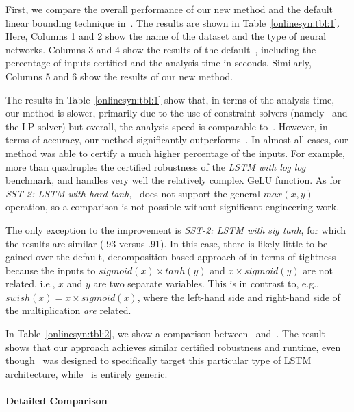 First, we compare the overall performance of our new method and the
default linear bounding technique in~\autolipra{}.  The results are shown
in Table~\ref{onlinesyn:tbl:1}.  Here, Columns 1 and 2 show the name of the dataset
and the type of neural networks.  Columns 3 and 4 show the results of the
default~\autolipra{}, including the percentage of inputs certified and
the analysis time in seconds.  Similarly, Columns 5 and 6 show the results
of our new method.

The results in Table~\ref{onlinesyn:tbl:1} show that, in terms of the analysis
time,
our method is slower, primarily due to the use of constraint solvers (namely~\dReal{} and
the LP solver) but overall, the analysis speed is
comparable to~\autolipra{}.
%
However, in terms of accuracy, our method significantly
outperforms~\autolipra{}.  In almost all
cases, our method was able to certify a much higher percentage of the inputs.
For example,~\Name{} more than quadruples the certified robustness of the
\emph{LSTM with log log} benchmark, and handles very well the relatively
complex GeLU function.
%
As for \emph{SST-2: LSTM with hard tanh},~\autolipra{} does not support the
general $ max(x, y) $ operation, so a comparison is not possible without
significant engineering work.

The only exception to the improvement is \emph{SST-2: LSTM with sig tanh},
for which the results are similar (.93 versus .91).
%
In this case, there is likely little to be gained over the default, decomposition-based approach of \autolipra{} in terms of tightness because
the inputs to $ sigmoid(x) \times tanh(y) $ and $ x \times sigmoid(y) $ are not
related, i.e., $ x $ and $ y
$ are two separate variables. This is in contrast to, e.g., $ swish(x) = x
\times sigmoid(x) $, where the left-hand side and right-hand side of the
multiplication \textit{are} related.
%

In Table~\ref{onlinesyn:tbl:2}, we show a comparison between~\Name{}
and~\popqorn{}. The
result shows that our approach achieves similar certified robustness and
runtime, even though~\popqorn{} was designed to specifically target this particular type of  LSTM architecture,
while~\Name{} is entirely generic.

\paragraph{Detailed Comparison}

